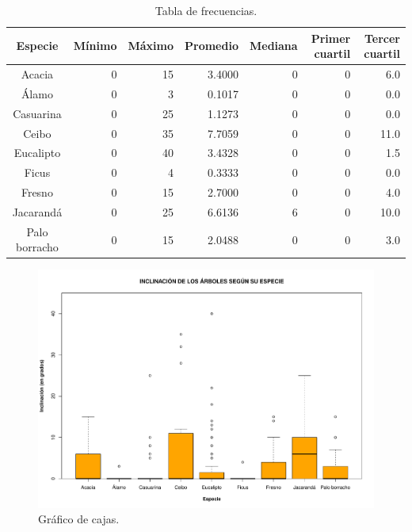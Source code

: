 \documentclass[11pt]{article}
\begin{document}
\begin{table}[h!]
  \begin{center}
    \begin{tabular}{| c | r | r | r | r | r | r |}
      \hline
      \textbf{Especie} & \textbf{Mínimo} & \textbf{Máximo} & \textbf{Promedio} &
      \textbf{Mediana} & \textbf{Primer cuartil} & \textbf{Tercer cuartil}  \\ \hline
      Acacia & 0 & 15 & 3.4000 & 0 & 0 & 6.0 \\ \hline
      Álamo & 0 & 3 & 0.1017 & 0 & 0 & 0.0 \\ \hline
      Casuarina & 0 & 25 & 1.1273 & 0 & 0 & 0.0 \\ \hline
      Ceibo & 0 & 35 & 7.7059 & 0 & 0 & 11.0 \\ \hline
      Eucalipto & 0 & 40 & 3.4328 & 0 & 0 & 1.5 \\ \hline
      Ficus & 0 & 4 & 0.3333 & 0 & 0 & 0.0 \\ \hline
      Fresno & 0 & 15 & 2.7000 & 0 & 0 & 4.0 \\ \hline
      Jacarandá & 0 & 25 & 6.6136 & 6 & 0 & 10.0 \\ \hline
      Palo borracho & 0 & 15 & 2.0488 & 0 & 0 & 3.0 \\ \hline
    \end{tabular}
    \caption{Tabla de frecuencias.}
    \label{tab:tablaInclinacionEspecie}
  \end{center}
\end{table}

\begin{figure}[h!]
  \begin{center}
    \includegraphics[width=0.9\linewidth]{boxInclinacionEspecie.pdf}
    \caption{Gráfico de cajas.}
    \label{fig:boxInclinacionEspecie}
  \end{center}  
\end{figure}
\end{document}
